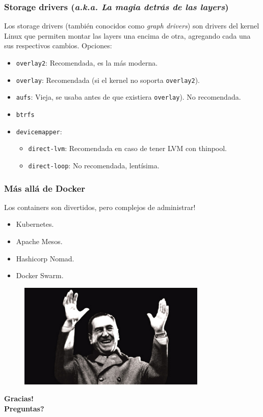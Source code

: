 \documentclass[xcolor={dvipsnames}]{beamer}
\begin{document}
\begin{frame}[fragile]
	\frametitle{Storage drivers (\textit{a.k.a. La magia detrás de las layers})}
	Los storage drivers (también conocidos como \textit{graph drivers}) son drivers del kernel Linux que permiten montar las layers una encima de otra, agregando cada una sus respectivos cambios. Opciones:
	\begin{itemize}
		\item \texttt{overlay2}: Recomendada, es la más moderna.
		\item \texttt{overlay}: Recomendada (si el kernel no soporta \texttt{overlay2}).
		\item \texttt{aufs}: Vieja, se usaba antes de que existiera \texttt{overlay}). No recomendada.
		\item \texttt{btrfs}
		\item \texttt{devicemapper}:
		\begin{itemize}
			\item \texttt{direct-lvm}: Recomendada en caso de tener LVM con thinpool.
			\item \texttt{direct-loop}: No recomendada, lentísima.
		\end{itemize}
	\end{itemize}
\end{frame}

\begin{frame}[fragile]
	\frametitle{Más allá de Docker}
	Los containers son divertidos, pero complejos de administrar!
	\begin{itemize}
		\item Kubernetes.
		\item Apache Mesos.
		\item Hashicorp Nomad.
		\item Docker Swarm.
	\end{itemize}
\end{frame}

\begin{frame}
	\vspace{-0.8cm}
	\begin{center}
		\begin{figure}
		\includegraphics[width = 0.8\textwidth]{./assets/peron1.jpg}
		\end{figure}
		\Large{\textbf{Gracias! \\ Preguntas?}}
	\end{center}
\end{frame}
\end{document}
